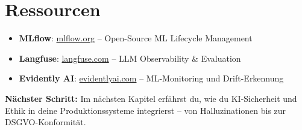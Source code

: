 \section{Ressourcen}

\begin{itemize}[leftmargin=*]
    \item \textbf{MLflow}: \href{https://mlflow.org}{mlflow.org} -- Open-Source ML Lifecycle Management
    \item \textbf{Langfuse}: \href{https://langfuse.com}{langfuse.com} -- LLM Observability \& Evaluation
    \item \textbf{Evidently AI}: \href{https://www.evidentlyai.com}{evidentlyai.com} -- ML-Monitoring und Drift-Erkennung
\end{itemize}

\textbf{Nächster Schritt:} Im nächsten Kapitel erfährst du, wie du KI-Sicherheit und Ethik in deine Produktionssysteme integrierst -- von Halluzinationen bis zur DSGVO-Konformität.
